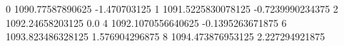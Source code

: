 0 1090.77587890625 -1.470703125
1 1091.5225830078125 -0.7239990234375
2 1092.24658203125 0.0
4 1092.1070556640625 -0.1395263671875
6 1093.823486328125 1.576904296875
8 1094.473876953125 2.227294921875
